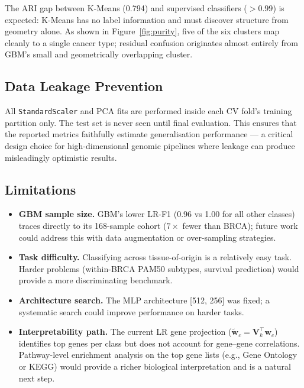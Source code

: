\documentclass[11pt,letterpaper]{article}
\begin{document}
The ARI gap between K-Means (0.794) and supervised classifiers ($>0.99$) is
expected: K-Means has no label information and must discover structure from
geometry alone.  As shown in Figure~\ref{fig:purity}, five of the six clusters
map cleanly to a single cancer type; residual confusion originates almost
entirely from GBM's small and geometrically overlapping cluster.

\subsection{Data Leakage Prevention}

All \texttt{StandardScaler} and PCA fits are performed inside each CV fold's
training partition only.  The test set is never seen until final evaluation.
This ensures that the reported metrics faithfully estimate generalisation
performance --- a critical design choice for high-dimensional genomic pipelines
where leakage can produce misleadingly optimistic results.

\subsection{Limitations}

\begin{itemize}[leftmargin=2em,itemsep=1pt]
  \item \textbf{GBM sample size.}  GBM's lower LR-F1 (0.96 vs 1.00 for all
        other classes) traces directly to its 168-sample cohort ($7\times$
        fewer than BRCA); future work could address this with data augmentation
        or over-sampling strategies.
  \item \textbf{Task difficulty.}  Classifying across tissue-of-origin is a
        relatively easy task.  Harder problems (within-BRCA PAM50 subtypes,
        survival prediction) would provide a more discriminating benchmark.
  \item \textbf{Architecture search.}  The MLP architecture [512, 256] was
        fixed; a systematic search could improve performance on harder tasks.
  \item \textbf{Interpretability path.}  The current LR gene projection
        ($\tilde{\mathbf{w}}_c = \mathbf{V}_k^\top \mathbf{w}_c$) identifies
        top genes per class but does not account for gene–gene correlations.
        Pathway-level enrichment analysis on the top gene lists (e.g.,
        Gene Ontology or KEGG) would provide a richer biological interpretation
        and is a natural next step.
\end{itemize}
\end{document}

